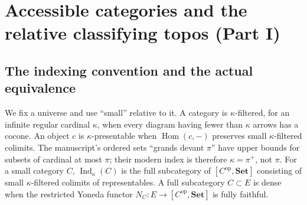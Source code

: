 \section{Accessible categories and the relative classifying topos (Part I)}\label{sec:categoryI}

\subsection{The indexing convention and the actual equivalence}
We fix a universe and use ``small'' relative to it.  A category is
$\kappa$-filtered, for an infinite regular cardinal $\kappa$, when every
diagram having fewer than $\kappa$ arrows has a cocone.  An object $c$ is
$\kappa$-presentable when $\operatorname{Hom}(c,-)$ preserves small
$\kappa$-filtered colimits.  The manuscript's ordered sets ``grands devant
$\pi$'' have upper bounds for subsets of cardinal at most $\pi$; their
modern index is therefore $\kappa=\pi^+$, not $\pi$.
For a small category $C$, $\operatorname{Ind}_\kappa(C)$ is the full
subcategory of $[C^{\mathrm{op}},\mathbf{Set}]$ consisting of small
$\kappa$-filtered colimits of representables.
A full subcategory $C\subset E$ is dense when the restricted Yoneda
functor $N_C:E\to[C^{\mathrm{op}},\mathbf{Set}]$ is fully faithful.

